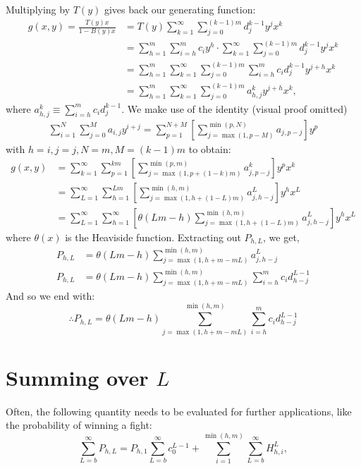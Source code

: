	Multiplying by $T(y)$ gives back our generating function:
	\begin{align}
		g(x, y) = \frac{T(y)x}{1-B(y)x} &= T(y)\sum_{k=1}^\infty \sum_{j=0}^{(k-1)m} d_j^{k-1} y^j x^k\\
		&= \sum_{h=1}^m \sum_{i=h}^{m}c_i y^h \cdot \sum_{k=1}^\infty \sum_{j=0}^{(k-1)m} d_j^{k-1} y^j x^k\\
		&= \sum_{h=1}^m  \sum_{k=1}^\infty \sum_{j=0}^{(k-1)m} \sum_{i=h}^{m} c_i d_j^{k-1} y^{j+h} x^k\\
		&= \sum_{h=1}^m  \sum_{k=1}^\infty \sum_{j=0}^{(k-1)m} a_{h, j}^k y^{j+h} x^k,
	\end{align}
	where $a_{h, j}^k \equiv \sum_{i=h}^{m} c_i d_j^{k-1}$. We make use of the identity (visual proof omitted)
	\begin{align}
		\sum_{i=1}^N \sum_{j=0}^M a_{i, j}y^{i+j} = \sum_{p=1}^{N+M}\left[ \sum_{j=\max(1, p-M)}^{\min(p, N)} a_{j, p-j}\right]y^p
	\end{align}
	with $h=i, j=j, N=m, M=(k-1)m$ to obtain:
	\begin{align}
		g(x, y) &= \sum_{k=1}^\infty \sum_{p=1}^{km} \left[\sum_{j=\max(1, p+(1-k)m)}^{\min(p, m)} a_{j, p-j}^k \right]y^px^k\\
		 &= \sum_{L=1}^\infty \sum_{h=1}^{Lm} \left[\sum_{j=\max(1, h+(1-L)m)}^{\min(h, m)} a_{j, h-j}^L \right]y^h x^L\\
		 &= \sum_{L=1}^\infty \sum_{h=1}^{\infty} \left[\theta(Lm-h)\sum_{j=\max(1, h+(1-L)m)}^{\min(h, m)} a_{j, h-j}^L \right]y^h x^L
	\end{align}
	where $\theta(x)$ is the Heaviside function. Extracting out $P_{h, L}$, we get,
	\begin{align}
		P_{h, L} &= \theta(Lm-h)\sum_{j=\max(1, h+m-mL)}^{\min(h, m)} a_{j, h-j}^L \\
		P_{h, L} &= \theta(Lm-h)\sum_{j=\max(1, h+m-mL)}^{\min(h, m)} \sum_{i=h}^m c_i d_{h-j}^{L-1}
	\end{align}
	And so we end with:
	\begin{equation}
		\boxed{\therefore P_{h, L} = \theta(Lm-h)\sum_{j=\max(1, h+m-mL)}^{\min(h, m)} \sum_{i=h}^m c_i d_{h-j}^{L-1} }
	\end{equation}
	

	\section{Summing over $L$}
		Often, the following quantity needs to be evaluated for further applications, like the probability of winning a fight:
		\begin{equation}
			\sum_{L=b}^\infty P_{h, L} = P_{h, 1}\sum_{L=b}^\infty c_0^{L-1}  + \sum_{i=1}^{\min(h, m)} \sum_{L=b}^\infty H_{h, i}^L,
		\end{equation}
		

